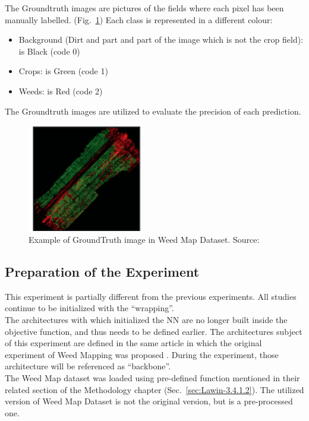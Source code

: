 The Groundtruth images are pictures of the fields where each pixel has been manually labelled. (Fig.~\ref{fig:figure-4.5.4})
Each class is represented in a different colour:
\begin{itemize}[itemsep=0.1cm]
	\item Background (Dirt and part and part of the image which is not the crop field): is Black (code 0)
	\item Crops: is Green (code 1)
	\item Weeds: is Red (code 2)
\end{itemize}
The Groundtruth images are utilized to evaluate the precision of each prediction.
\begin{figure}[t]
	\centering
	\includegraphics[width=5cm]{figures/figure-4.5.4.png}
	\caption[Example of GroundTruth in Weed Map Dataset]{Example of GroundTruth image in Weed Map Dataset. Source:~\cite{Tesi-2.1}}
	\label{fig:figure-4.5.4}
\end{figure}

\subsection{Preparation of the Experiment}

This experiment is partially different from the previous experiments. All studies continue to be initialized with the “wrapping”.
\\[0.3cm]The architectures with which initialized the NN are no longer built inside the objective function, and thus needs to be defined earlier. The architectures subject of this experiment are defined in the same article in which the original experiment of Weed Mapping was proposed \cite{WeedMap-PaperThesis}. During the experiment, those architecture will be referenced as “backbone”.
\\[0.3cm]The Weed Map dataset was loaded using pre-defined function mentioned in their related section of the Methodology chapter (Sec.~\ref{sec:Lawin-3.4.1.2}). The utilized version of Weed Map Dataset is not the original version, but is a pre-processed one.

